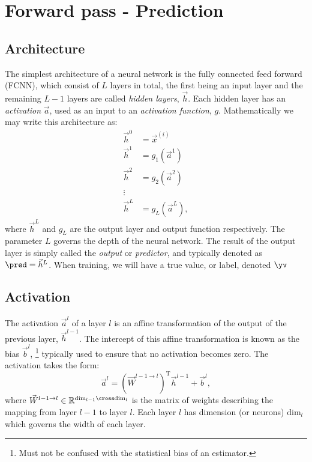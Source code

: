 %
%

\section{Forward pass - Prediction}
    \subsection{Architecture}
        The simplest architecture of a neural network is the fully connected feed forward (FCNN), which consist of $L$ layers in total, the first being an input layer and the remaining $L-1$ layers are called \textit{hidden layers}, $\vec{h}$. Each hidden layer has an \textit{activation} $\vec{a}$, used as an input to an \textit{activation function}, $g$. Mathematically we may write this architecture as:
        \begin{equation}
            \begin{split}
                \vec{h}^0 &= \vec{x}^{(i)} \\
                \vec{h}^1 &= g_1(\vec{a}^1) \\
                \vec{h}^2 &= g_2(\vec{a}^2) \\
                \vdots & \\
                \vec{h}^{L} &= g_L(\vec{a}^L),
            \end{split}
        \end{equation}
        where $\vec{h}^L$ and $g_L$ are the output layer and output function respectively. The parameter $L$ governs the depth of the neural network. The result of the output layer is simply called the \textit{output} or \textit{predictor}, and typically denoted as $\pred = \vec{h}^L$. When training, we will have a true value, or label, denoted $\yv$
    \subsection{Activation}
        The activation $\vec{a}^l$ of a layer $l$ is an affine transformation of the output of the previous layer, $\vec{h}^{l-1}$. The intercept of this affine transformation is known as the bias $\vec{b}^l$, \footnote{Must not be confused with the statistical bias of an estimator.} typically used to ensure that no activation becomes zero. The activation takes the form:
        \begin{equation}
            \vec{a}^l = (\vec{W}^{l-1\to l})^\mathrm{T}\vec{h}^{l-1} + \vec{b}^l,
        \end{equation}
        where $\vec{W}^{l-1\to l} \in \mathbb{R}^{\mathrm{dim}_{l-1}\cross\mathrm{dim}_l}$ is the matrix of weights describing the mapping from layer $l-1$ to layer $l$. Each layer $l$ has dimension (or neurons) $\mathrm{dim}_l$ which governs the width of each layer. 

